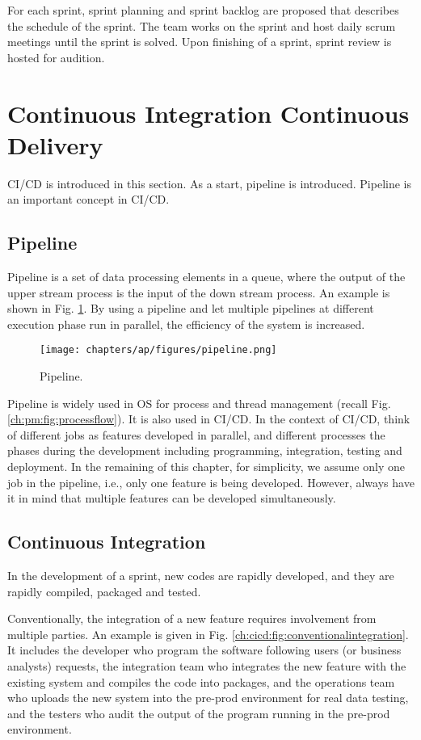For each sprint, sprint planning and sprint backlog are proposed that describes the schedule of the sprint. The team works on the sprint and host daily scrum meetings until the sprint is solved. Upon finishing of a sprint, sprint review is hosted for audition.

\section{Continuous Integration Continuous Delivery}

CI/CD is introduced in this section. As a start, pipeline is introduced. Pipeline is an important concept in CI/CD.

\subsection{Pipeline}

Pipeline is a set of data processing elements in a queue, where the output of the upper stream process is the input of the down stream process. An example is shown in Fig. \ref{ch:cicd:fig:pipeline}. By using a pipeline and let multiple pipelines at different execution phase run in parallel, the efficiency of the system is increased.
\begin{figure}[htbp]
	\centering
	\texttt{[image: chapters/ap/figures/pipeline.png]}
	\caption{Pipeline.} \label{ch:cicd:fig:pipeline}
\end{figure}

Pipeline is widely used in OS for process and thread management (recall Fig. \ref{ch:pm:fig:processflow}). It is also used in CI/CD. In the context of CI/CD, think of different jobs as features developed in parallel, and different processes the phases during the development including programming, integration, testing and deployment. In the remaining of this chapter, for simplicity, we assume only one job in the pipeline, i.e., only one feature is being developed. However, always have it in mind that multiple features can be developed simultaneously.

\subsection{Continuous Integration}

In the development of a sprint, new codes are rapidly developed, and they are rapidly compiled, packaged and tested.

Conventionally, the integration of a new feature requires involvement from multiple parties. An example is given in Fig. \ref{ch:cicd:fig:conventionalintegration}. It includes the developer who program the software following users (or business analysts) requests, the integration team who integrates the new feature with the existing system and compiles the code into packages, and the operations team who uploads the new system into the pre-prod environment for real data testing, and the testers who audit the output of the program running in the pre-prod environment.

